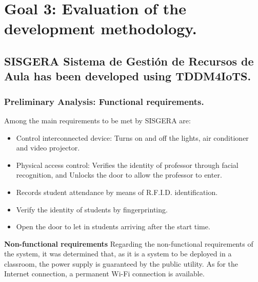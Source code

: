 \documentclass[]{scrartcl}
\begin{document}
\section*{Goal 3: Evaluation of the development methodology.}
	\subsection*{SISGERA \textbf{Sis}tema de \textbf{Ge}stión de \textbf{R}ecursos de \textbf{A}ula has been developed using \textbf{TDDM4IoTS.}}
	\subsubsection*{Preliminary Analysis: Functional requirements.}
	Among the main requirements to be met by SISGERA are:
	\begin{itemize}
		\item Control interconnected device: Turns on and off the lights, air conditioner and video projector.
		\item Physical access control: Verifies the identity of professor through facial recognition, and Unlocks the door to allow the professor to enter.
		\item Records student attendance by means of R.F.I.D. identification.
		\item Verify the identity of students by fingerprinting.
		\item Open the door to let in students arriving after the start time.
	\end{itemize}
	\textbf{Non-functional requirements}
	Regarding the non-functional requirements of the system, it was determined that, as it is a system to be deployed in a classroom, the power supply is guaranteed by the public utility. As for the Internet connection, a permanent Wi-Fi connection is available.
	
\end{document}
